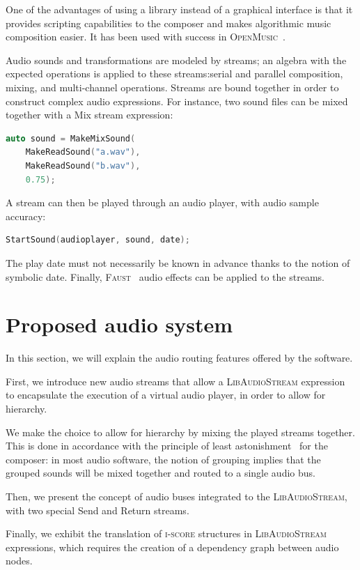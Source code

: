 \documentclass{article}
\newcommand*{\LibAudioStream}{\textsc{LibAudioStream}\xspace}
\newcommand*{\iscore}{\textsc{i-score}\xspace}
\newcommand*{\openmusic}{\textsc{OpenMusic}\xspace}
\newcommand*{\faust}{\textsc{Faust}\xspace}
\begin{document}
One of the advantages of using a library instead of a graphical interface is that it provides scripting capabilities to the composer and makes algorithmic music composition easier.
It has been used with success in \openmusic~\cite{bouche2014programmation}.

Audio sounds and transformations are modeled by streams; an algebra with the expected operations is applied to these streams:serial and parallel composition, mixing, and multi-channel operations.
Streams are bound together in order to construct complex audio expressions.
For instance, two sound files can be mixed together with a Mix stream expression: 
\begin{lstlisting}[language=C++,columns=fullflexible,basicstyle=\ttfamily]
auto sound = MakeMixSound(
    MakeReadSound("a.wav"), 
    MakeReadSound("b.wav"), 
    0.75);
\end{lstlisting}
A stream can then be played through an audio player, with audio sample accuracy:
 
\begin{lstlisting}[language=C++,columns=fullflexible,basicstyle=\ttfamily]
StartSound(audioplayer, sound, date);
\end{lstlisting}

The play date must not necessarily be known in advance thanks to the notion of symbolic date.
Finally, \faust~\cite{orlarey2009faust} audio effects can be applied to the streams.

\section{Proposed audio system}
In this section, we will explain the audio routing 
features offered by the software.

First, we introduce new audio streams that allow a \LibAudioStream
expression to encapsulate the execution of a virtual audio player, 
in order to allow for hierarchy.

We make the choice to allow for hierarchy by mixing the played streams together.
This is done in accordance with the principle of least astonishment~\cite{seebach2001cranky} for the composer: 
in most audio software, the notion of grouping implies that the grouped sounds will be mixed 
together and routed to a single audio bus.

Then, we present the concept of audio buses integrated to the \LibAudioStream,
with two special Send and Return streams.

Finally, we exhibit the translation of \iscore structures in \LibAudioStream expressions, 
which requires the creation of a dependency graph between audio nodes.
\end{document}
